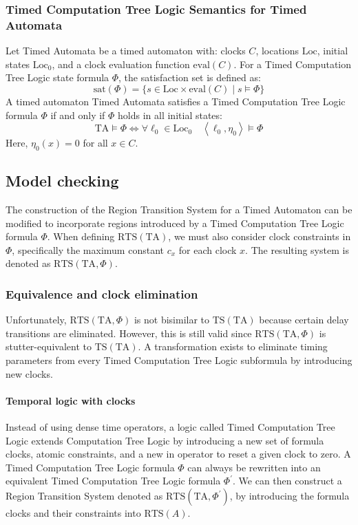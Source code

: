 \subsubsection{Timed Computation Tree Logic Semantics for Timed Automata}
Let Timed Automata be a timed automaton with: clocks $C$, locations $\text{Loc}$, initial states $\text{Loc}_0$, and a clock evaluation function $\text{eval}(C)$. 
For a Timed Computation Tree Logic state formula $\Phi$, the satisfaction set is defined as:
\[\text{sat}(\Phi)=\{s\in\text{Loc}\times\text{eval}(C)\mid s\models\Phi\}\]
A timed automaton Timed Automata satisfies a Timed Computation Tree Logic formula $\Phi$ if and only if $\Phi$ holds in all initial states:
\[\text{TA}\models\Phi\Leftrightarrow\forall\ell_0\in\text{Loc}_0\quad\left\langle \ell_0,\eta_0\right\rangle\models\Phi \]
Here, $\eta_0(x)=0$ for all $x\in C$. 

\subsection{Model checking}
The construction of the Region Transition System for a Timed Automaton can be modified to incorporate regions introduced by a Timed Computation Tree Logic formula $\Phi$. 
When defining $\text{RTS}(\text{TA})$, we must also consider clock constraints in $\Phi$, specifically the maximum constant $c_x$ for each clock $x$.
The resulting system is denoted as $\text{RTS}(\text{TA},\Phi)$. 

\subsubsection{Equivalence and clock elimination}
Unfortunately, $\text{RTS}(\text{TA},\Phi)$ is not bisimilar to $\text{TS}(\text{TA})$ because certain delay transitions are eliminated.
However, this is still valid since $\text{RTS}(\text{TA},\Phi)$ is stutter-equivalent to $\text{TS}(\text{TA})$.
A transformation exists to eliminate timing parameters from every Timed Computation Tree Logic subformula by introducing new clocks.

\paragraph*{Temporal logic with clocks}
Instead of using dense time operators, a logic called Timed Computation Tree Logic extends Computation Tree Logic by introducing a new set of formula clocks, atomic constraints, and a new in operator to reset a given clock to zero.
A Timed Computation Tree Logic formula $\Phi$ can always be rewritten into an equivalent Timed Computation Tree Logic formula $\Phi^\prime$.
We can then construct a Region Transition System  denoted as $\text{RTS}(\text{TA},\Phi^\prime)$, by introducing the formula clocks and their constraints into $\text{RTS}(A)$.

